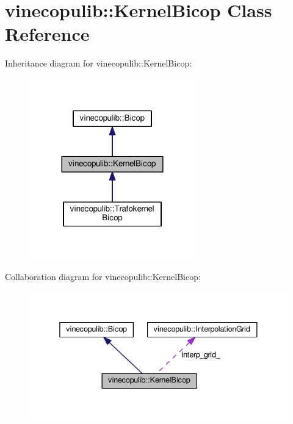 \hypertarget{classvinecopulib_1_1_kernel_bicop}{}\section{vinecopulib\+:\+:Kernel\+Bicop Class Reference}
\label{classvinecopulib_1_1_kernel_bicop}


Inheritance diagram for vinecopulib\+:\+:Kernel\+Bicop\+:\nopagebreak
\begin{figure}[H]
\begin{center}
\leavevmode
\includegraphics[width=204pt]{classvinecopulib_1_1_kernel_bicop__inherit__graph}
\end{center}
\end{figure}


Collaboration diagram for vinecopulib\+:\+:Kernel\+Bicop\+:\nopagebreak
\begin{figure}[H]
\begin{center}
\leavevmode
\includegraphics[width=338pt]{classvinecopulib_1_1_kernel_bicop__coll__graph}
\end{center}
\end{figure}
